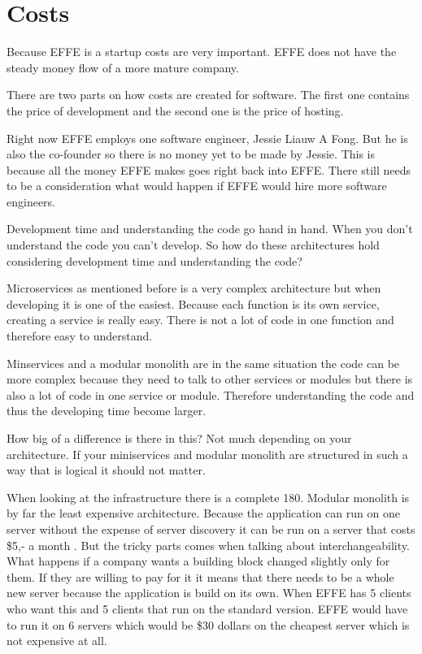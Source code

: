 \section{Costs}
\label{sec:Costs}

Because EFFE is a startup costs are very important. EFFE does not have the steady money flow of a more mature company.

There are two parts on how costs are created for software. The first one contains the price of development and the second one is the price of hosting.

Right now EFFE employs one software engineer, Jessie Liauw A Fong. But he is also the co-founder so there is no money yet to be made by Jessie. This is because all the money EFFE makes goes right back into EFFE. There still needs to be a consideration what would happen if EFFE would hire more software engineers.

Development time and understanding the code go hand in hand. When you don’t understand the code you can’t develop. So how do these architectures hold considering development time and understanding the code?

Microservices as mentioned before is a very complex architecture but when developing it is one of the easiest. Because each function is its own service, creating a service is really easy. There is not a lot of code in one function and therefore easy to understand.

Minservices and a modular monolith are in the same situation the code can be more complex because they need to talk to other services or modules but there is also a lot of code in one service or module. Therefore understanding the code and thus the developing time become larger.

How big of a difference is there in this? Not much depending on your architecture. If your miniservices and modular monolith are structured in such a way that is logical it should not matter.

When looking at the infrastructure there is a complete 180. Modular monolith is by far the least expensive architecture. Because the application can run on one server without the expense of server discovery it can be run on a server that costs \$5,- a month \cite{digitalOcean}. But the tricky parts comes when talking about interchangeability. What happens if a company wants a building block changed slightly only for them. If they are willing to pay for it it means that there needs to be a whole new server because the application is build on its own. When EFFE has 5 clients who want this and 5 clients that run on the standard version. EFFE would have to run it on 6 servers which would be \$30 dollars on the cheapest server which is not expensive at all.

